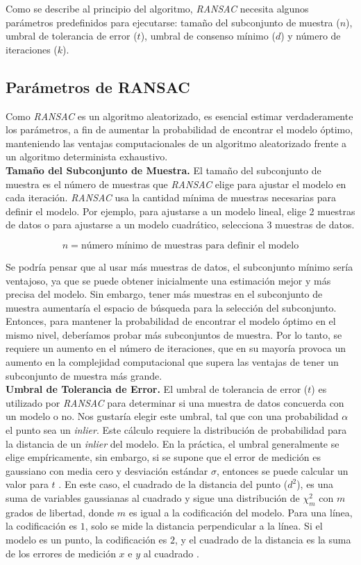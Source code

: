 Como se describe al principio del algoritmo, \textit{RANSAC} necesita algunos parámetros predefinidos para ejecutarse: tamaño del subconjunto de muestra ($n$), umbral de tolerancia de error ($t$), umbral de consenso mínimo ($d$) y número de iteraciones ($k$).

\subsection{Parámetros de RANSAC}

Como \textit{RANSAC} es un algoritmo aleatorizado, es esencial estimar verdaderamente los parámetros, a fin de aumentar la probabilidad de encontrar el modelo óptimo, manteniendo las ventajas computacionales de un algoritmo aleatorizado frente a un algoritmo determinista exhaustivo.\\

\textbf{Tamaño del Subconjunto de Muestra.}
El tamaño del subconjunto de muestra es el número de muestras que \textit{RANSAC} elige para ajustar el modelo en cada iteración. \textit{RANSAC} usa la cantidad mínima de muestras necesarias para definir el modelo. Por ejemplo, para ajustarse a un modelo lineal, elige 2 muestras de datos o para ajustarse a un modelo cuadrático, selecciona 3 muestras de datos.

$$n = \text{número mínimo de muestras para definir el modelo}$$

Se podría pensar que al usar más muestras de datos, el subconjunto mínimo sería ventajoso, ya que se puede obtener inicialmente una estimación mejor y más precisa del modelo. Sin embargo, tener más muestras en el subconjunto de muestra aumentaría el espacio de búsqueda para la selección del subconjunto. Entonces, para mantener la probabilidad de encontrar el modelo óptimo en el mismo nivel, deberíamos probar más subconjuntos de muestra. Por lo tanto, se requiere un aumento en el número de iteraciones, que en su mayoría provoca un aumento en la complejidad computacional que supera las ventajas de tener un subconjunto de muestra más grande.\\

\textbf{Umbral de Tolerancia de Error.}
El umbral de tolerancia de error ($t$) es utilizado por \textit{RANSAC} para determinar si una muestra de datos concuerda con un modelo o no. Nos gustaría elegir este umbral, tal que con una probabilidad $\alpha$ el punto sea un \textit{inlier}. Este cálculo requiere la distribución de probabilidad para la distancia de un \textit{inlier} del modelo. En la práctica, el umbral generalmente se elige empíricamente, sin embargo, si se supone que el error de medición es gaussiano con media cero y desviación estándar $\sigma$, entonces se puede calcular un valor para $t$ \cite{RichardAndrew}. En este caso, el cuadrado de la distancia del punto ($d^2$), es una suma de variables gaussianas al cuadrado y sigue una distribución de $\chi_{m}^2$ con $m$ grados de libertad, donde $m$ es igual a la codificación del modelo. Para una línea, la codificación es $1$, solo se mide la distancia perpendicular a la línea. Si el modelo es un punto, la codificación es $2$, y el cuadrado de la distancia es la suma de los errores de medición $x$ e $y$ al cuadrado \cite{RichardAndrew}.

